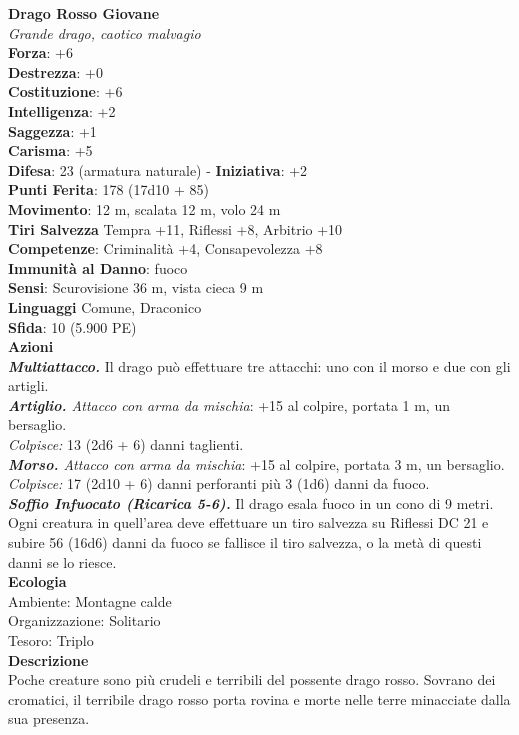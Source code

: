 \begin{multicols}{2}
\medskip\textbf{Drago Rosso Giovane}\\
\emph{Grande drago, caotico malvagio}\\
\textbf{Forza}: +6\\
\textbf{Destrezza}: +0\\
\textbf{Costituzione}: +6\\
\textbf{Intelligenza}: +2\\
\textbf{Saggezza}: +1\\
\textbf{Carisma}: +5\\
\textbf{Difesa}: 23 (armatura naturale) - \textbf{Iniziativa}: +2\\
\textbf{Punti Ferita}: 178 (17d10 + 85)\\
\textbf{Movimento}: 12 m, scalata 12 m, volo 24 m\\
\textbf{Tiri Salvezza} Tempra +11, Riflessi +8, Arbitrio +10\\
\textbf{Competenze}: Criminalità +4, Consapevolezza +8\\
\textbf{Immunità al Danno}: fuoco\\
\textbf{Sensi}: Scurovisione 36 m, vista cieca 9 m\\
\textbf{Linguaggi} Comune, Draconico\\
\textbf{Sfida}: 10 (5.900 PE)\smallskip\\
\smallskip\textbf{Azioni}\\
\emph{\textbf{Multiattacco.}} Il drago può effettuare tre attacchi: uno con il morso e due con gli artigli.\\
\emph{\textbf{Artiglio.} Attacco con arma da mischia}: +15 al colpire, portata 1 m, un bersaglio.\\
\emph{Colpisce:} 13 (2d6 + 6) danni taglienti. \\
\emph{\textbf{Morso.} Attacco con arma da mischia}: +15 al colpire, portata 3 m, un bersaglio.\\
\emph{Colpisce:} 17 (2d10 + 6) danni perforanti più 3 (1d6) danni da fuoco.\\
\emph{\textbf{Soffio Infuocato (Ricarica 5-6).}} Il drago esala fuoco in un cono di 9 metri. Ogni creatura in quell'area deve effettuare un tiro salvezza su Riflessi DC  21 e subire 56 (16d6) danni da fuoco se fallisce il tiro salvezza, o la metà di questi danni se lo riesce.\\
\textbf{Ecologia}\\
Ambiente: Montagne calde\\
Organizzazione: Solitario\\
Tesoro: Triplo\\
\textbf{Descrizione}\\
Poche creature sono più crudeli e terribili del possente drago rosso. Sovrano dei cromatici, il terribile drago rosso porta rovina e morte nelle terre minacciate dalla sua presenza.\\


\end{multicols}

